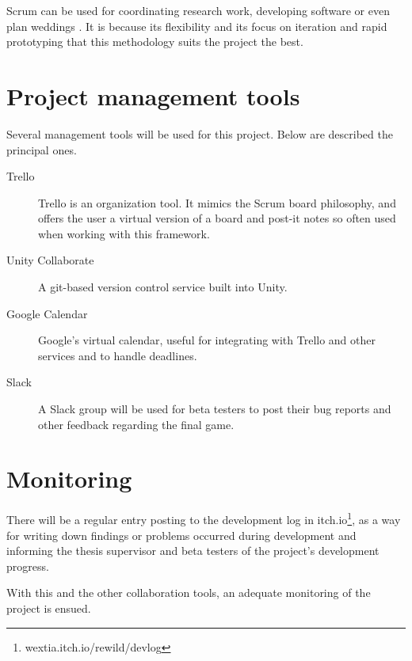 Scrum can be used for coordinating research work, developing software or even plan weddings
. It is because its flexibility and its focus on iteration and rapid prototyping that this methodology suits the project the best.


\section{Project management tools}

Several management tools will be used for this project. Below are described the principal ones.

\begin{description}
\item[Trello]{Trello is an organization tool. It mimics the Scrum board philosophy, and offers the user a virtual version of a board and post-it notes so often used when working with this framework. }
\item[Unity Collaborate]{ A git-based version control service built into Unity. }
\item[Google Calendar]{ Google's virtual calendar, useful for integrating with Trello and other services and to handle deadlines. }
\item[Slack]{ A Slack group will be used for beta testers to post their bug reports and other feedback regarding the final game. }
\end{description}

\section{Monitoring}

There will be a regular entry posting to the development log in itch.io\footnote{wextia.itch.io/rewild/devlog}, as a way for writing down findings or problems occurred during development and informing the thesis supervisor and beta testers of the project's development progress. 

With this and the other collaboration tools, an adequate monitoring of the project is ensued.

